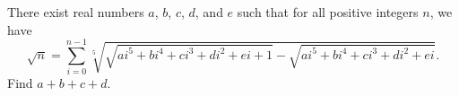 There exist real numbers $a$,  $b$,  $c$,  $d$,  and $e$ such that for all positive integers $n$,  we have$$\sqrt{n}=\sum_{i=0}^{n-1}\sqrt[5]{\sqrt{ai^5+bi^4+ci^3+di^2+ei+1}-\sqrt{ai^5+bi^4+ci^3+di^2+ei}}.$$Find $a+b+c+d$.